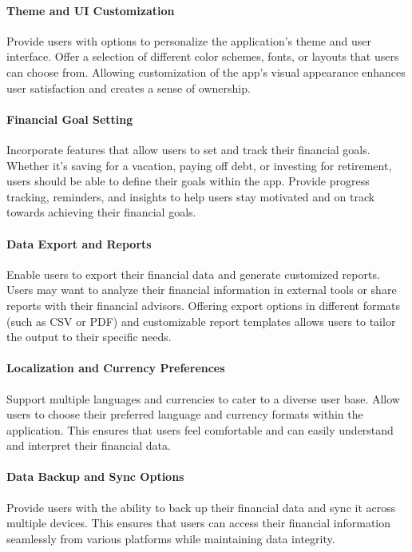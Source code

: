 \paragraph{Theme and UI Customization}
Provide users with options to personalize the application's theme and user interface. Offer a selection of different 
color schemes, fonts, or layouts that users can choose from. Allowing customization of the app's visual appearance 
enhances user satisfaction and creates a sense of ownership.

\paragraph{Financial Goal Setting}
Incorporate features that allow users to set and track their financial goals. Whether it's saving for a 
vacation, paying off debt, or investing for retirement, users should be able to define their goals within 
the app. Provide progress tracking, reminders, and insights to help users stay motivated and on track towards 
achieving their financial goals.

\paragraph{Data Export and Reports}
Enable users to export their financial data and generate customized reports. Users may want to analyze their 
financial information in external tools or share reports with their financial advisors. Offering export options 
in different formats (such as CSV or PDF) and customizable report templates allows users to tailor the output to 
their specific needs.

\paragraph{Localization and Currency Preferences}
Support multiple languages and currencies to cater to a diverse user base. Allow users to choose their preferred 
language and currency formats within the application. This ensures that users feel comfortable and can easily 
understand and interpret their financial data.

\paragraph{Data Backup and Sync Options}
Provide users with the ability to back up their financial data and sync it across multiple devices. This ensures 
that users can access their financial information seamlessly from various platforms while maintaining data integrity.\\
\\

